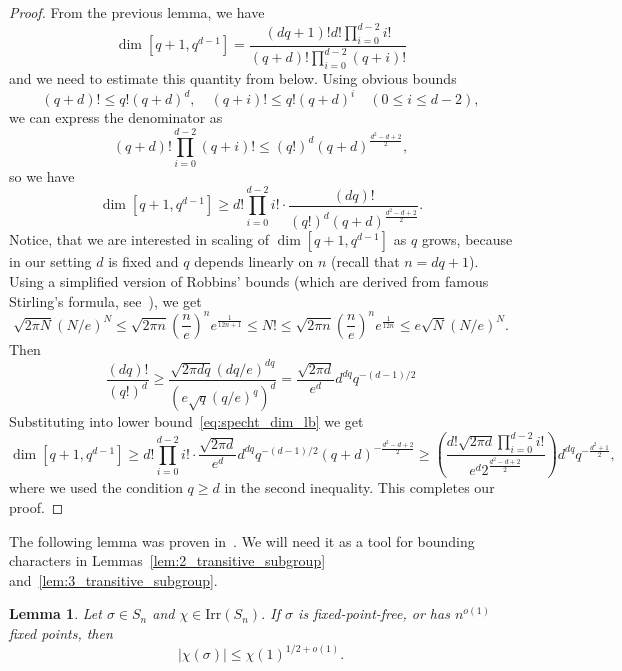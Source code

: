 \documentclass[10pt,twocolumn,superscriptaddress,aps,amsmath,amssymb,citeautoscript,floatfix,prx]{revtex4-2}
\theoremstyle{plain}
\theoremstyle{plain}
\theoremstyle{plain}
\theoremstyle{plain}
\theoremstyle{plain}
\theoremstyle{plain}
\theoremstyle{plain}
\newtheorem{smlemma}[smtheorem]{Lemma}
\theoremstyle{definition}
\theoremstyle{plain}
\begin{document}
\begin{appendix}
\begin{proof}
    From the previous lemma, we have
\[
    \operatorname{dim} [q+1, q^{d-1}]=\frac{(d q+1)!d!\prod_{i=0}^{d-2} i!}{(q+d)!\prod_{i=0}^{d-2}(q+i)!}
\]
and we need to estimate this quantity from below. Using obvious bounds
\[
    (q+d)!\leq q!(q+d)^d, \quad(q+i)!\leq q!(q+d)^i \quad(0 \leq i \leq d-2),
\]
we can express the denominator as
\[
    (q+d)!\prod_{i=0}^{d-2}(q+i)!\leq(q!)^d(q+d)^{\frac{d^2-d+2}{2}},
\]
so we have
\begin{equation}\label{eq:specht_dim_lb}
    \operatorname{dim} [q+1, q^{d-1}] \geq d!\prod_{i=0}^{d-2} i! \cdot \frac{(dq)!}{(q!)^d(q+d)^{\frac{d^2-d+2}{2}}}.
\end{equation}
Notice, that we are interested in scaling of $\operatorname{dim} [q+1, q^{d-1}]$ as $q$ grows, because in our setting
$d$ is fixed and $q$ depends linearly on $n$ (recall that $n=d q+1$). Using a simplified version of Robbins' bounds 
(which are derived from famous Stirling's formula, see~\cite{Robbins1955}), we get 
\[
   \sqrt{2 \pi N}(N / e)^N \leq \sqrt{2 \pi n}\left(\frac{n}{e}\right)^n e^{\frac{1}{12 n+1}} 
   \leq N!\leq \sqrt{2 \pi n}\left(\frac{n}{e}\right)^n e^{\frac{1}{12 n}} \leq e \sqrt{N}(N / e)^N.
\]
Then
\[
    \frac{(d q)!}{(q!)^d} \geq \frac{\sqrt{2 \pi d q}(d q / e)^{d q}}{\left(e \sqrt{q}(q / e)^q\right)^d}=\frac{\sqrt{2 \pi d}}{e^d} d^{d q} q^{-(d-1) / 2}
\]
Substituting into lower bound~\eqref{eq:specht_dim_lb} we get
\[
    \operatorname{dim} [q+1, q^{d-1}] \geq d!\prod_{i=0}^{d-2} i! \cdot \frac{\sqrt{2 \pi d}}{e^d} d^{d q} q^{-(d-1) / 2}(q+d)^{-\frac{d^2-d+2}{2}} 
    \geq \left(\frac{d!\sqrt{2 \pi d}\prod_{i=0}^{d-2} i!}{e^d 2^{\frac{d^2-d+2}{2}}} \right) d^{d q} q^{-\frac{d^2+1}{2}},
\]
where we used the condition $q\geq d$ in the second inequality. This completes our proof.

\end{proof}

The following lemma was proven in~\cite{LarsenShalev2008}. We will need it as a tool for bounding characters in Lemmas~\ref{lem:2_transitive_subgroup} and~\ref{lem:3_transitive_subgroup}.

\begin{smlemma}\label{lem:character_bound}
    Let $\sigma \in S_n$ and $\chi \in \text{Irr}(S_n)$. If $\sigma$ is fixed-point-free, or has $n^{o(1)}$ fixed points, then
    \[
        |\chi(\sigma)| \leq \chi(1)^{1 / 2+o(1)}.
    \]
\end{smlemma}


\end{appendix}
\end{document}
